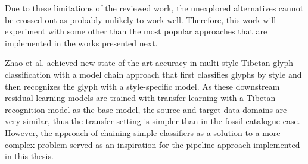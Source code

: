 \documentclass{article}
\begin{document}
Due to these limitations of the reviewed work, the unexplored alternatives cannot be crossed out as probably unlikely to work well. Therefore, this work will experiment with some other than the most popular approaches that are implemented in the works presented next.





Zhao et al. \cite{4zhaoTibetan} achieved new state of the art accuracy in multi-style Tibetan glyph classification
with a model chain approach that first classifies glyphs by style and then recognizes the glyph with a style-specific model. As these downstream
 residual learning models are trained with transfer learning with a Tibetan 
 recognition model as the base model, the source and target data domains are very similar,
  thus the transfer setting is simpler than in the fossil catalogue case. However, the approach of 
  chaining simple classifiers as a solution to a more complex problem served as an inspiration for
   the pipeline approach implemented in this thesis.



\end{document}
